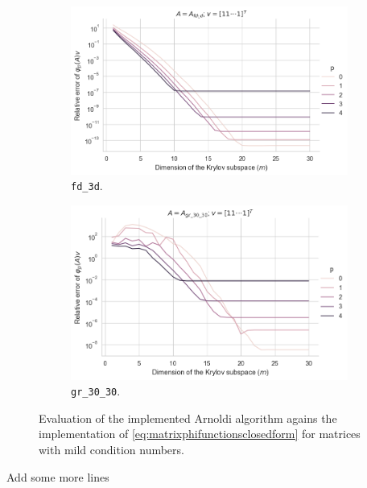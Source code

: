 \begin{figure}[h!]
    \centering
    \begin{subfigure}[b]{0.45\textwidth}
        \includegraphics[width=\textwidth]{img/krylovunivariate/fd_3d_recursive.png}
        \caption{\texttt{fd\_3d}.}
    \end{subfigure}
    \hfill
    \begin{subfigure}[b]{0.45\textwidth}
        \includegraphics[width=\textwidth]{img/krylovunivariate/gr_30_30_recursive.png}
        \caption{\texttt{gr\_30\_30}.}
    \end{subfigure}
    \caption{Evaluation of the implemented Arnoldi algorithm agains the implementation of \autoref{eq:matrixphifunctionsclosedform}
    for matrices with mild condition numbers.}
    \label{fig:krylovmethodunivariateevaluationrecursive}
\end{figure}


Add some more lines
